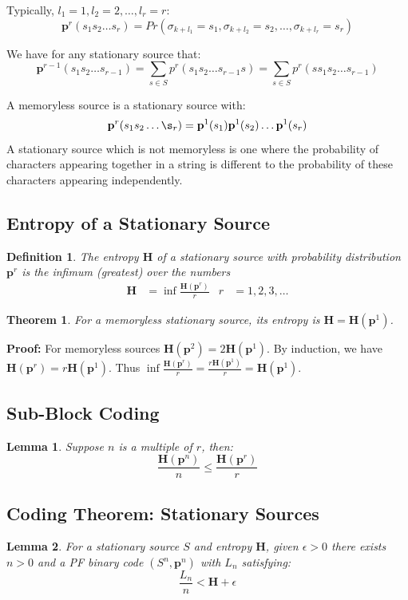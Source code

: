 \documentclass[11pt]{article}
\newtheorem{defn}{Definition}
\newtheorem{theo}{Theorem}
\newtheorem{lem}{Lemma}
\begin{document}
Typically, $l_1 = 1, l_2 = 2, \ldots, l_r = r$:
\[
  \textbf{p}^r(s_1 s_2 \ldots s_r) = Pr(\sigma_{k + l_1} = s_1, \sigma_{k + l_2} = s_2, \ldots, \sigma_{k + l_r} = s_r)
\]

We have for any stationary source that:
\[
  \textbf{p}^{r - 1}(s_1 s_2 \ldots s_{r - 1}) = \sum_{s \in S} p^r(s_1 s_2 \ldots s_{r - 1}s) = \sum_{s \in S} p^r(s s_1 s_2 \ldots s_{r - 1})
\]

A memoryless source is a stationary source with:
\[
  \textbf{p}^r(s_1 s_2 \ldots \s_r) = \textbf{p}^1 (s_1) \textbf{p}^1 (s_2) \ldots \textbf{p}^1 (s_r)
\]
A stationary source which is not memoryless is one where the probability of characters appearing together in a string is different to the probability of these characters appearing independently.

\subsection{Entropy of a Stationary Source}
\begin{defn}
  The entropy $\textbf{H}$ of a stationary source with probability distribution $\textbf{p}^r$ is the infimum (greatest) over the numbers
  \begin{align*}
    \textbf{H} &= \inf \frac{\textbf{H}(\textbf{p}^r)}{r} & r &= 1, 2, 3, \ldots
  \end{align*}
\end{defn}

\begin{theo}
  For a memoryless stationary source, its entropy is $\textbf{H} = \textbf{H}(\textbf{p}^1)$.
\end{theo}

\textbf{Proof:}
For memoryless sources $\textbf{H}(\textbf{p}^2) = 2 \textbf{H}(\textbf{p}^1)$.
By induction, we have $\textbf{H}(\textbf{p}^r) = r \textbf{H}(\textbf{p}^1)$. 
Thus $\inf \frac{\textbf{H}(\textbf{p}^r)}{r} = \frac{r \textbf{H}(\textbf{p}^1)}{r} = \textbf{H}(\textbf{p}^1)$.

\subsection{Sub-Block Coding}
\begin{lem}
  Suppose $n$ is a multiple of $r$, then:
  \[
     \frac{\textbf{H}(\textbf{p}^n)}{n} \leq \frac{\textbf{H}(\textbf{p}^r)}{r}
  \]
\end{lem}

\subsection{Coding Theorem: Stationary Sources}
\begin{lem}
  For a stationary source $S$ and entropy $\textbf{H}$, given $\epsilon > 0$ there exists $n > 0$ and a PF binary code $(S^n, \textbf{p}^n)$ with $L_n$ satisfying:
  \[
    \frac{L_n}{n} < \textbf{H} + \epsilon
  \]
\end{lem}
\end{document}
